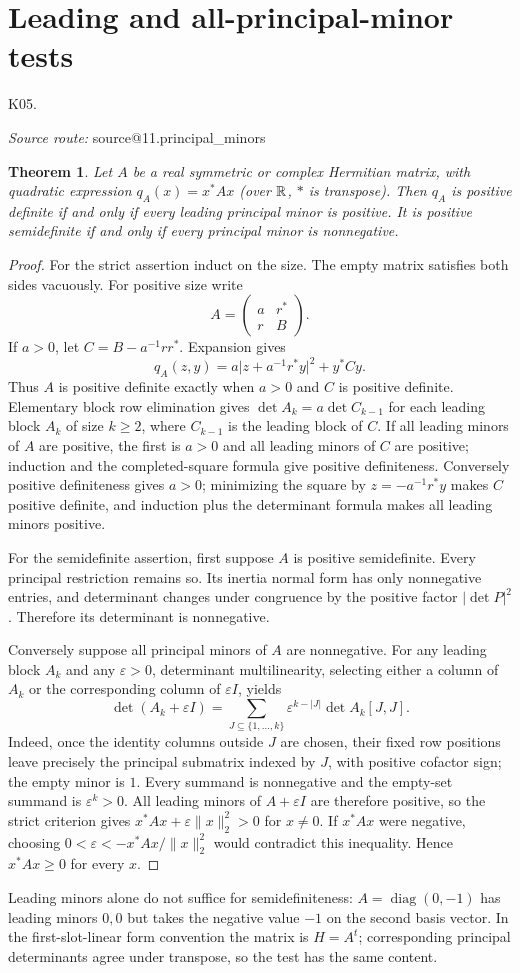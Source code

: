 \documentclass[11pt,a4paper]{book}
\makeatletter
\newtheorem{theorem}{Theorem}[chapter]
\theoremstyle{definition}\newtheorem{definition}[theorem]{Definition}
\theoremstyle{remark}\newtheorem{remark}[theorem]{Remark}
\DeclareMathOperator{\diag}{diag}\DeclareMathOperator{\id}{id}
\newcommand{\norm}[1]{\lVert #1\rVert}
\newcommand{\abs}[1]{\lvert #1\rvert}
\newcommand{\Kentry}[2]{\section{#2}\label{k:#1}\noindent\textsf{\small K05.\detokenize{#1}}\par
  \begingroup\small\color{black!65}\textit{Source route: }\csname source@#1\endcsname\par\endgroup}
\makeatother
\begin{document}
\Kentry{11.principal_minors}{Leading and all-principal-minor tests}
\begin{theorem}
Let $A$ be a real symmetric or complex Hermitian matrix, with quadratic expression $q_A(x)=x^*Ax$ (over $\mathbb R$, $*$ is transpose). Then $q_A$ is positive definite if and only if every leading principal minor is positive. It is positive semidefinite if and only if every principal minor is nonnegative.
\end{theorem}
\begin{proof}
For the strict assertion induct on the size. The empty matrix satisfies both sides vacuously. For positive size write
\[A=\begin{pmatrix}a&r^*\\r&B\end{pmatrix}.
\]
If $a>0$, let $C=B-a^{-1}rr^*$. Expansion gives
\[q_A(z,y)=a\abs{z+a^{-1}r^*y}^2+y^*Cy.
\]
Thus $A$ is positive definite exactly when $a>0$ and $C$ is positive definite. Elementary block row elimination gives $\det A_k=a\det C_{k-1}$ for each leading block $A_k$ of size $k\ge2$, where $C_{k-1}$ is the leading block of $C$. If all leading minors of $A$ are positive, the first is $a>0$ and all leading minors of $C$ are positive; induction and the completed-square formula give positive definiteness. Conversely positive definiteness gives $a>0$; minimizing the square by $z=-a^{-1}r^*y$ makes $C$ positive definite, and induction plus the determinant formula makes all leading minors positive.

For the semidefinite assertion, first suppose $A$ is positive semidefinite. Every principal restriction remains so. Its inertia normal form has only nonnegative entries, and determinant changes under congruence by the positive factor $\abs{\det P}^2$. Therefore its determinant is nonnegative.

Conversely suppose all principal minors of $A$ are nonnegative. For any leading block $A_k$ and any $\varepsilon>0$, determinant multilinearity, selecting either a column of $A_k$ or the corresponding column of $\varepsilon I$, yields
\[\det(A_k+\varepsilon I)=\sum_{J\subseteq\{1,\ldots,k\}}\varepsilon^{k-|J|}\det A_k[J,J].
\]
Indeed, once the identity columns outside $J$ are chosen, their fixed row positions leave precisely the principal submatrix indexed by $J$, with positive cofactor sign; the empty minor is $1$. Every summand is nonnegative and the empty-set summand is $\varepsilon^k>0$. All leading minors of $A+\varepsilon I$ are therefore positive, so the strict criterion gives $x^*Ax+\varepsilon\norm{x}_2^2>0$ for $x\ne0$. If $x^*Ax$ were negative, choosing $0<\varepsilon<-x^*Ax/\norm{x}_2^2$ would contradict this inequality. Hence $x^*Ax\ge0$ for every $x$.
\end{proof}
Leading minors alone do not suffice for semidefiniteness: $A=\diag(0,-1)$ has leading minors $0,0$ but takes the negative value $-1$ on the second basis vector. In the first-slot-linear form convention the matrix is $H=A^t$; corresponding principal determinants agree under transpose, so the test has the same content.
\end{document}
